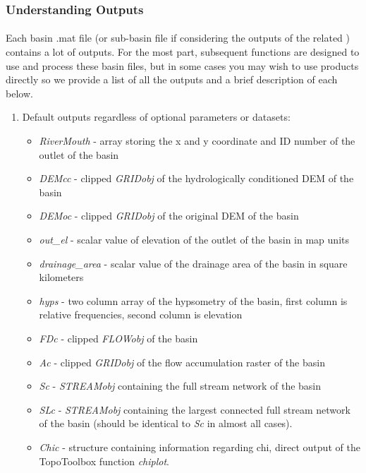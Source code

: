 \subsubsection{Understanding Outputs} \label{sec:UndOuts}
\paragraph{}Each basin .mat file (or sub-basin file if considering the outputs of the related ) contains a lot of outputs. For the most part, subsequent functions are designed to use and process these basin files, but in some cases you may wish to use products directly so we provide a list of all the outputs and a brief description of each below.

\begin{enumerate}
	\item Default outputs regardless of optional parameters or datasets:
	\begin{itemize}
		\item \textit{RiverMouth} - array storing the x and y coordinate and ID number of the outlet of the basin
		\item \textit{DEMcc} - clipped \textit{GRIDobj} of the hydrologically conditioned DEM of the basin
		\item \textit{DEMoc} - clipped \textit{GRIDobj} of the original DEM of the basin
		\item \textit{out\_el} - scalar value of elevation of the outlet of the basin in map units
		\item \textit{drainage\_area} - scalar value of the drainage area of the basin in square kilometers
		\item \textit{hyps} - two column array of the hypsometry of the basin, first column is relative frequencies, second column is elevation
		\item \textit{FDc} - clipped \textit{FLOWobj} of the basin
		\item \textit{Ac} - clipped \textit{GRIDobj} of the flow accumulation raster of the basin
		\item \textit{Sc} - \textit{STREAMobj} containing the full stream network of the basin
		\item \textit{SLc} - \textit{STREAMobj} containing the largest connected full stream network of the basin (should be identical to \textit{Sc} in almost all cases).
		\item \textit{Chic} - structure containing information regarding chi, direct output of the TopoToolbox function \textit{chiplot}.

\end{itemize}
\end{enumerate}
